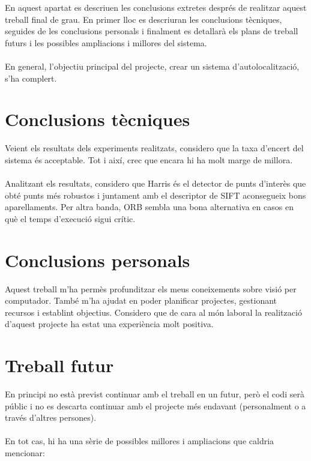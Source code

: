 \label{sec:Conclusions}

En aquest apartat es descriuen les conclusions extretes després de realitzar aquest treball final de grau. En primer lloc es descriuran les conclusions tècniques, seguides de les conclusions personals
i finalment es detallarà els plans de treball futurs i les possibles ampliacions i millores del sistema.\\\\
En general, l'objectiu principal del projecte, crear un sistema d'autolocalització, s'ha complert.

\section{Conclusions tècniques}
	Veient els resultats dels experiments realitzats, considero que la taxa d'encert del sistema és acceptable. Tot i així, crec que encara hi ha molt marge de millora.\\\\
	Analitzant els resultats, considero que Harris és el detector de punts d'interès que obté punts més robustos i juntament amb el descriptor de SIFT aconsegueix bons aparellaments. Per altra banda,
	ORB sembla una bona alternativa en casos en què el temps d'execució sigui crític.
\section{Conclusions personals}
	Aquest treball m'ha permès profunditzar els meus coneixements sobre visió per computador. També m'ha ajudat en poder planificar projectes, gestionant recursos i establint objectius.
	Considero que de cara al món laboral la realització d'aquest projecte ha estat una experiència molt positiva.

\newpage
\section{Treball futur}
	En principi no està previst continuar amb el treball en un futur, però el codi serà públic i no es descarta continuar amb el projecte més endavant (personalment o a través d'altres persones).\\\\
	En tot cas, hi ha una sèrie de possibles millores i ampliacions que caldria mencionar:\\

